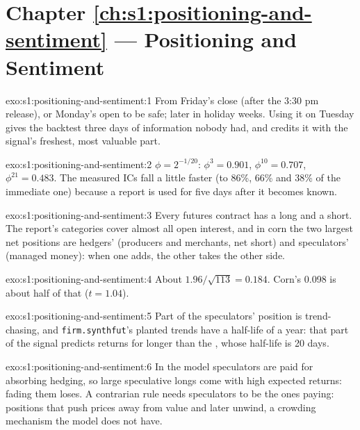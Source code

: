 \section*{Chapter \ref{ch:s1:positioning-and-sentiment} --- Positioning and Sentiment}

\begin{solution}{exo:s1:positioning-and-sentiment:1}
From Friday's close (after the 3:30 pm release), or Monday's open to be safe; later in holiday weeks. Using it on Tuesday gives the backtest three days of
information nobody had, and credits it with the signal's freshest, most valuable part.
\end{solution}

\begin{solution}{exo:s1:positioning-and-sentiment:2}
$\phi = 2^{-1/20}$: $\phi^3 = 0.901$, $\phi^{10} = 0.707$, $\phi^{21} = 0.483$. The measured ICs fall a little faster (to 86\%, 66\% and 38\% of the
immediate one) because a report is used for five days after it becomes known.
\end{solution}

\begin{solution}{exo:s1:positioning-and-sentiment:3}
Every futures contract has a long and a short. The report's categories cover almost all open interest, and in corn the two largest net positions are
hedgers' (producers and merchants, net short) and speculators' (managed money): when one adds, the other takes the other side.
\end{solution}

\begin{solution}{exo:s1:positioning-and-sentiment:4}
About $1.96/\sqrt{113} = 0.184$. Corn's 0.098 is about half of that ($t = 1.04$).
\end{solution}

\begin{solution}{exo:s1:positioning-and-sentiment:5}
Part of the speculators' position is trend-chasing, and \texttt{firm.synthfut}'s planted trends have a half-life of a year: that part of the signal
predicts returns for longer than the , whose half-life is 20 days.
\end{solution}

\begin{solution}{exo:s1:positioning-and-sentiment:6}
In the model speculators are paid for absorbing hedging, so large speculative longs come with high expected returns: fading them loses. A contrarian rule
needs speculators to be the ones paying: positions that push prices away from value and later unwind, a crowding mechanism the model does not have.
\end{solution}

